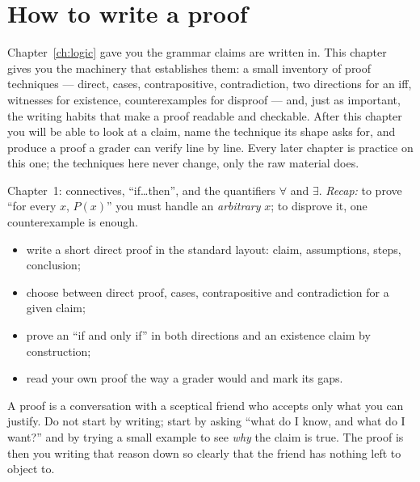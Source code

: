 \chapter{How to write a proof}\label{ch:proof}
\newcommand{\defect}[1]{\textcolor{amber}{\sffamily\bfseries\textsuperscript{[#1]}}}

Chapter~\ref{ch:logic} gave you the grammar claims are written in. This chapter
gives you the machinery that establishes them: a small inventory of proof
techniques --- direct, cases, contrapositive, contradiction, two directions for
an iff, witnesses for existence, counterexamples for disproof --- and, just as
important, the writing habits that make a proof readable and checkable. After
this chapter you will be able to look at a claim, name the technique its shape
asks for, and produce a proof a grader can verify line by line. Every later
chapter is practice on this one; the techniques here never change, only the
raw material does.

\begin{rulebox}
Chapter~1: connectives, ``if\dots then'', and the quantifiers $\forall$ and $\exists$. \emph{Recap:} to prove ``for every $x$, $P(x)$'' you must handle an \emph{arbitrary} $x$; to disprove it, one counterexample is enough.
\end{rulebox}
\begin{wins}
\begin{itemize}
\item write a short direct proof in the standard layout: claim, assumptions, steps, conclusion;
\item choose between direct proof, cases, contrapositive and contradiction for a given claim;
\item prove an ``if and only if'' in both directions and an existence claim by construction;
\item read your own proof the way a grader would and mark its gaps.
\end{itemize}
\end{wins}
\begin{principle}
A proof is a conversation with a sceptical friend who accepts only what you can justify. Do not start by writing; start by asking ``what do I know, and what do I want?'' and by trying a small example to see \emph{why} the claim is true. The proof is then you writing that reason down so clearly that the friend has nothing left to object to.
\end{principle}


